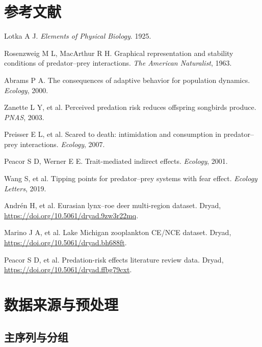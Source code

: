 \documentclass[12pt,a4paper]{ctexart}
\begin{document}
\section*{参考文献}
\begin{enumerate}[label={[\arabic*]}]
 \item Lotka A J. \emph{Elements of Physical Biology}. 1925.
 \item Rosenzweig M L, MacArthur R H. Graphical representation and stability conditions of predator--prey interactions. \emph{The American Naturalist}, 1963.
 \item Abrams P A. The consequences of adaptive behavior for population dynamics. \emph{Ecology}, 2000.
 \item Zanette L Y, et al. Perceived predation risk reduces offspring songbirds produce. \emph{PNAS}, 2003.
 \item Preisser E L, et al. Scared to death: intimidation and consumption in predator--prey interactions. \emph{Ecology}, 2007.
 \item Peacor S D, Werner E E. Trait-mediated indirect effects. \emph{Ecology}, 2001.
 \item Wang S, et al. Tipping points for predator--prey systems with fear effect. \emph{Ecology Letters}, 2019.
 \item Andrén H, et al. Eurasian lynx--roe deer multi-region dataset. Dryad, \url{https://doi.org/10.5061/dryad.9zw3r22mq}.
 \item Marino J A, et al. Lake Michigan zooplankton CE/NCE dataset. Dryad, \url{https://doi.org/10.5061/dryad.bh688ft}.
 \item Peacor S D, et al. Predation-risk effects literature review data. Dryad, \url{https://doi.org/10.5061/dryad.ffbg79cxt}.
\end{enumerate}

\clearpage
\appendix

\section{数据来源与预处理}

\subsection{主序列与分组}
\end{document}
